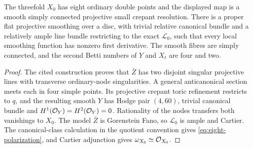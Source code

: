 \begin{proposition}\label{prop:eight-family}
The threefold $X_0$ has eight ordinary double points and the displayed
map is a smooth simply connected projective small crepant resolution.
There is a proper flat projective smoothing over a disc, with trivial
relative canonical bundle and a relatively ample line bundle restricting
to the exact $\mathcal L_0$, such that every local smoothing function
has nonzero first derivative. The smooth fibres are simply connected,
and the second Betti numbers of $Y$ and $X_t$ are four and two.
\end{proposition}
\begin{proof}
The cited construction proves that $\bar Z$ has two disjoint singular
projective lines with transverse ordinary-node singularities. A general
anticanonical section meets each in four simple points. Its projective
crepant toric refinement restricts to $q$, and the resulting smooth
$Y$ has Hodge pair $(4,60)$, trivial canonical bundle and
$H^1(\mathcal O_Y)=H^2(\mathcal O_Y)=0$. Rationality of the nodes transfers both
vanishings to $X_0$. The model $\bar Z$ is Gorenstein Fano, so
$\mathcal L_0$ is ample and Cartier. The canonical-class calculation
in the quotient convention gives \eqref{eq:eight-polarization}, and
Cartier adjunction gives $\omega_{X_0}\simeq\mathcal O_{X_0}$.


\end{proof}
